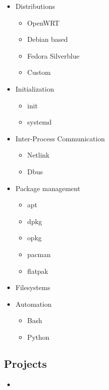 \begin{itemize}
    \item Distributions
    \begin{itemize}
        \item OpenWRT
        \item Debian based
        \item Fedora Silverblue
        \item Custom
    \end{itemize}

    \item Initialization
    \begin{itemize}
        \item init
        \item systemd
    \end{itemize}

    \item Inter-Process Communication
    \begin{itemize}
        \item Netlink
        \item Dbus
    \end{itemize}

    \item Package management
    \begin{itemize}
        \item apt
        \item dpkg
        \item opkg
        \item pacman
        \item flatpak
    \end{itemize}

    \item Filesystems
    \begin{itemize}
    \end{itemize}

    \item Automation
    \begin{itemize}
        \item Bash
        \item Python
    \end{itemize}

\end{itemize}

\subsection{Projects}

\begin{itemize}
    \item \noprojects
\end{itemize}

\newpage
